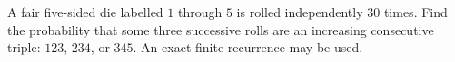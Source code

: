A fair five-sided die labelled $1$ through $5$ is rolled independently $30$ times. Find the probability that some three successive rolls are an increasing consecutive triple: $123$, $234$, or $345$. An exact finite recurrence may be used.
